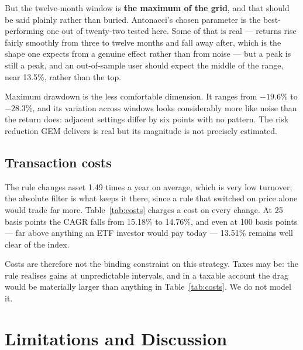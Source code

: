 \documentclass[11pt,a4paper]{article}
\begin{document}
\begin{table}[H]
  \centering
  \caption{Robustness to the momentum lookback window.}
  \label{tab:lookback}
  
\end{table}

But the twelve-month window is \textbf{the maximum of the grid}, and that
should be said plainly rather than buried. Antonacci's chosen parameter is the
best-performing one out of twenty-two tested here. Some of that is real ---
returns rise fairly smoothly from three to twelve months and fall away after,
which is the shape one expects from a genuine effect rather than from noise ---
but a peak is still a peak, and an out-of-sample user should expect the middle
of the range, near 13.5\%, rather than the top.

Maximum drawdown is the less comfortable dimension. It ranges from $-19.6$\% to
$-28.3$\%, and its variation across windows looks considerably more like noise
than the return does: adjacent settings differ by six points with no pattern.
The risk reduction GEM delivers is real but its magnitude is not precisely
estimated.

\subsection{Transaction costs}

The rule changes asset 1.49 times a year on average, which is very low
turnover; the absolute filter is what keeps it there, since a rule that
switched on price alone would trade far more. Table~\ref{tab:costs} charges a
cost on every change. At 25 basis points the CAGR falls from 15.18\% to
14.76\%, and even at 100 basis points --- far above anything an ETF investor
would pay today --- 13.51\% remains well clear of the index.

\begin{table}[H]
  \centering
  \caption{Robustness to transaction costs.}
  \label{tab:costs}
  
\end{table}

Costs are therefore not the binding constraint on this strategy. Taxes may
be: the rule realises gains at unpredictable intervals, and in a taxable
account the drag would be materially larger than anything in
Table~\ref{tab:costs}. We do not model it.

\section{Limitations and Discussion}
\label{sec:limitations}
\end{document}
